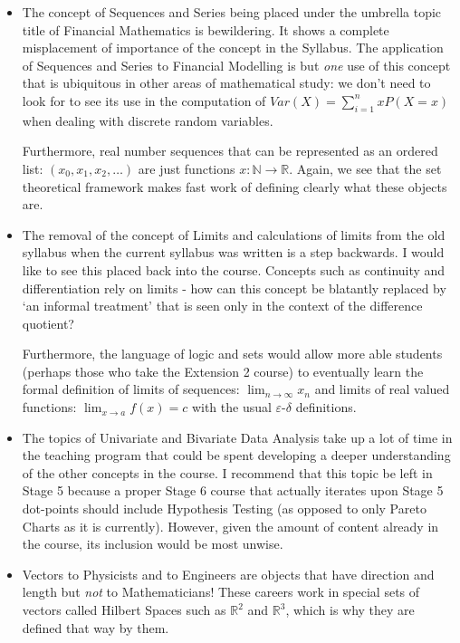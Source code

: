 \documentclass[11pt, a4paper, oneside]{article}
\begin{document}
\begin{itemize}
  \item The concept of Sequences and Series being placed under the umbrella topic title of Financial Mathematics is bewildering. It shows a complete misplacement of importance of the concept in the Syllabus. The application of Sequences and Series to Financial Modelling is but \emph{one} use of this concept that is ubiquitous in other areas of mathematical study: we don't need to look for to see its use in the computation of $Var(X) = \sum_{i=1}^n xP(X=x)$ when dealing with discrete random variables.

    Furthermore, real number sequences that can be represented as an ordered list: $(x_0, x_1, x_2, \ldots)$ are just functions $x: \mathbb{N} \rightarrow \mathbb{R}$. Again, we see that the set theoretical framework makes fast work of defining clearly what these objects are.

  \item The removal of the concept of Limits and calculations of limits from the old syllabus when the current syllabus was written is a step backwards. I would like to see this placed back into the course. Concepts such as continuity and differentiation rely on limits - how can this concept be blatantly replaced by `an informal treatment' that is seen only in the context of the difference quotient?

    Furthermore, the language of logic and sets would allow more able students (perhaps those who take the Extension 2 course) to eventually learn the formal definition of limits of sequences: $\lim_{n\rightarrow \infty} x_n$ and limits of real valued functions: $\lim_{x \rightarrow a} f(x) = c$ with the usual $\varepsilon$-$\delta$ definitions.

  \item The topics of Univariate and Bivariate Data Analysis take up a lot of time in the teaching program that could be spent developing a deeper understanding of the other concepts in the course. I recommend that this topic be left in Stage 5 because a proper Stage 6 course that actually iterates upon Stage 5 dot-points should include Hypothesis Testing (as opposed to only Pareto Charts as it is currently). However, given the amount of content already in the course, its inclusion would be most unwise.

  \item Vectors to Physicists and to Engineers are objects that have direction and length but \emph{not} to Mathematicians! These careers work in special sets of vectors called Hilbert Spaces such as $\mathbb{R}^2$ and $\mathbb{R}^3$, which is why they are defined that way by them.


\end{itemize}
\end{document}
